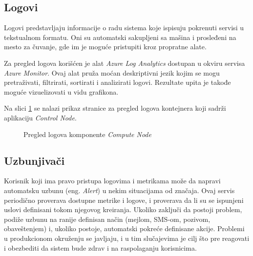 \documentclass[12pt,oneside]{memoir}
\begin{document}
\subsection{Logovi}

Logovi predstavljaju informacije o radu sistema koje ispisuju pokrenuti servisi u tekstualnom formatu. Oni su automatski sakupljeni sa mašina i prosleđeni na mesto za čuvanje, gde im je moguće pristupiti kroz propratne alate.

Za pregled logova korišćen je alat \emph{Azure Log Analytics} dostupan u okviru servisa \emph{Azure Monitor}. Ovaj alat pruža moćan deskriptivni jezik kojim se mogu pretraživati, filtrirati, sortirati i analizirati logovi. Rezultate upita je takođe moguće vizuelizovati u vidu grafikona.

Na slici \ref{fig:computenodelogs} se nalazi prikaz stranice za pregled logova kontejnera koji sadrži aplikaciju \emph{Control Node}.

\begin{figure}[!ht]
  \centering
  \caption{Pregled logova komponente \emph{Compute Node}}
  \label{fig:computenodelogs}
\end{figure}


\subsection{Uzbunjivači}

Korisnik koji ima pravo pristupa logovima i metrikama može da napravi automatsku uzbunu (eng. \emph{Alert}) u nekim situacijama od značaja. Ovaj servis periodično proverava dostupne metrike i logove, i proverava da li su se ispunjeni uslovi definisani tokom njegovog kreiranja. Ukoliko zaključi da postoji problem, podiže uzbunu na ranije definisan način (mejlom, SMS-om, pozivom, obaveštenjem) i, ukoliko postoje, automatski pokreće definisane akcije. Problemi u produkcionom okruženju se javljaju, i u tim slučajevima je cilj što pre reagovati i obezbediti da sistem bude zdrav i na raspolaganju korisnicima.
\end{document}
